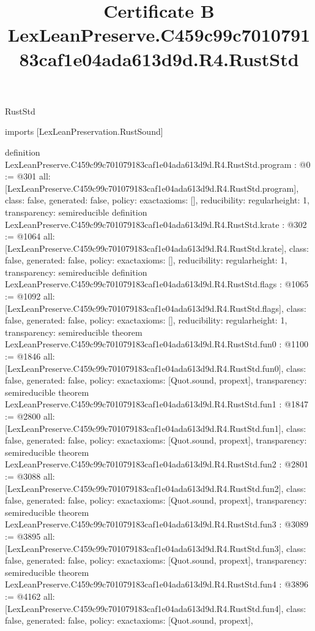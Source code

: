 \begin{lexlean}{RustStd}
\title{Certificate B LexLeanPreserve.C459c99c701079183caf1e04ada613d9d.R4.RustStd}
\begin{coremodule}
imports [LexLeanPreservation.RustSound]

definition LexLeanPreserve.C459c99c701079183caf1e04ada613d9d.R4.RustStd.program : @0 := @301 {
  all: [LexLeanPreserve.C459c99c701079183caf1e04ada613d9d.R4.RustStd.program],
  class: false,
  generated: false,
  policy: exact{axioms: []},
  reducibility: regular{height: 1},
  transparency: semireducible
}
definition LexLeanPreserve.C459c99c701079183caf1e04ada613d9d.R4.RustStd.krate : @302 := @1064 {
  all: [LexLeanPreserve.C459c99c701079183caf1e04ada613d9d.R4.RustStd.krate],
  class: false,
  generated: false,
  policy: exact{axioms: []},
  reducibility: regular{height: 1},
  transparency: semireducible
}
definition LexLeanPreserve.C459c99c701079183caf1e04ada613d9d.R4.RustStd.flags : @1065 := @1092 {
  all: [LexLeanPreserve.C459c99c701079183caf1e04ada613d9d.R4.RustStd.flags],
  class: false,
  generated: false,
  policy: exact{axioms: []},
  reducibility: regular{height: 1},
  transparency: semireducible
}
theorem LexLeanPreserve.C459c99c701079183caf1e04ada613d9d.R4.RustStd.fun0 : @1100 := @1846 {
  all: [LexLeanPreserve.C459c99c701079183caf1e04ada613d9d.R4.RustStd.fun0],
  class: false,
  generated: false,
  policy: exact{axioms: [Quot.sound, propext]},
  transparency: semireducible
}
theorem LexLeanPreserve.C459c99c701079183caf1e04ada613d9d.R4.RustStd.fun1 : @1847 := @2800 {
  all: [LexLeanPreserve.C459c99c701079183caf1e04ada613d9d.R4.RustStd.fun1],
  class: false,
  generated: false,
  policy: exact{axioms: [Quot.sound, propext]},
  transparency: semireducible
}
theorem LexLeanPreserve.C459c99c701079183caf1e04ada613d9d.R4.RustStd.fun2 : @2801 := @3088 {
  all: [LexLeanPreserve.C459c99c701079183caf1e04ada613d9d.R4.RustStd.fun2],
  class: false,
  generated: false,
  policy: exact{axioms: [Quot.sound, propext]},
  transparency: semireducible
}
theorem LexLeanPreserve.C459c99c701079183caf1e04ada613d9d.R4.RustStd.fun3 : @3089 := @3895 {
  all: [LexLeanPreserve.C459c99c701079183caf1e04ada613d9d.R4.RustStd.fun3],
  class: false,
  generated: false,
  policy: exact{axioms: [Quot.sound, propext]},
  transparency: semireducible
}
theorem LexLeanPreserve.C459c99c701079183caf1e04ada613d9d.R4.RustStd.fun4 : @3896 := @4162 {
  all: [LexLeanPreserve.C459c99c701079183caf1e04ada613d9d.R4.RustStd.fun4],
  class: false,
  generated: false,
  policy: exact{axioms: [Quot.sound, propext]},
}
\end{coremodule}
\end{lexlean}
